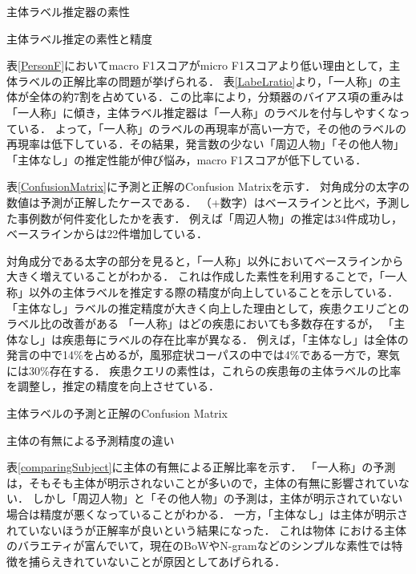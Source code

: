 \documentclass[japanese]{jnlp_1.4}
\begin{document}
\begin{table}[t]
\caption{主体ラベル推定器の素性}
\label{Feature}

\end{table}
\begin{table}[t]
\caption{主体ラベル推定の素性と精度}
\label{PersonF}

\end{table}

表\ref{PersonF}においてmacro F1スコアがmicro F1スコアより低い理由として，主体ラベルの正解比率の問題が挙げられる．
表\ref{LabeLratio}より，「一人称」の主体が全体の約7割を占めている．この比率により，分類器のバイアス項の重みは「一人称」に傾き，主体ラベル推定器は「一人称」のラベルを付与しやすくなっている．
よって，「一人称」のラベルの再現率が高い一方で，その他のラベルの再現率は低下している．その結果，発言数の少ない「周辺人物」「その他人物」「主体なし」の推定性能が伸び悩み，macro F1スコアが低下している．

表\ref{ConfusionMatrix}に予測と正解のConfusion Matrixを示す．
対角成分の太字の数値は予測が正解したケースである．
（+数字）はベースラインと比べ，予測した事例数が何件変化したかを表す．
例えば「周辺人物」の推定は34件成功し，ベースラインからは22件増加している．

対角成分である太字の部分を見ると，「一人称」以外においてベースラインから大きく増えていることがわかる．
これは作成した素性を利用することで，「一人称」以外の主体ラベルを推定する際の精度が向上していることを示している．
「主体なし」ラベルの推定精度が大きく向上した理由として，疾患クエリごとのラベル比の改善がある
「一人称」はどの疾患においても多数存在するが， 「主体なし」は疾患毎にラベルの存在比率が異なる．
例えば，「主体なし」は全体の発言の中で14\%を占めるが，風邪症状コーパスの中では4\%である一方で，寒気には30\%存在する．
疾患クエリの素性は，これらの疾患毎の主体ラベルの比率を調整し，推定の精度を向上させている．

\begin{table}[b]
\caption{主体ラベルの予測と正解のConfusion Matrix}
\label{ConfusionMatrix}

\end{table}
\begin{table}[b]
\caption{主体の有無による予測精度の違い}
\label{comparingSubject}

\end{table}

表\ref{comparingSubject}に主体の有無による正解比率を示す．
「一人称」の予測は，そもそも主体が明示されないことが多いので，主体の有無に影響されていない．
しかし「周辺人物」と「その他人物」の予測は，主体が明示されていない場合は精度が悪くなっていることがわかる．
一方，「主体なし」は主体が明示されていないほうが正解率が良いという結果になった．
これは物体 における主体のバラエティが富んでいて，現在のBoWやN-gramなどのシンプルな素性では特徴を捕らえきれていないことが原因としてあげられる．
\end{document}
